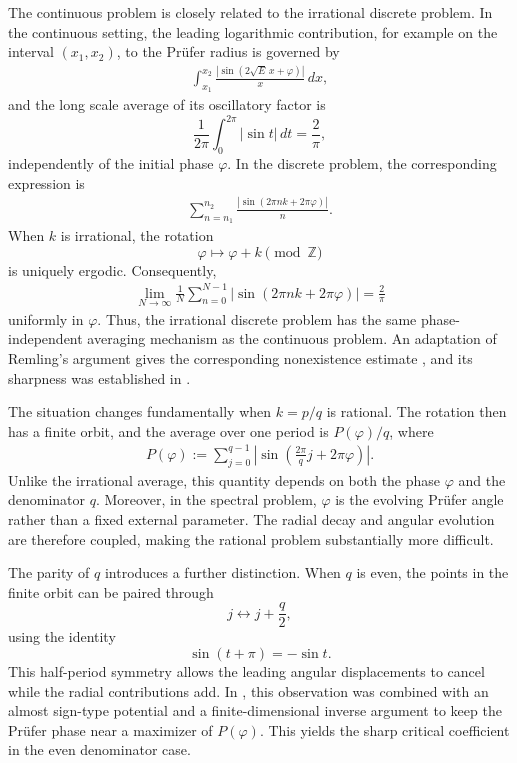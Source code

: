 \documentclass[12pt]{amsart}
\theoremstyle{plain}
\theoremstyle{definition}
\begin{document}
The continuous problem is closely related to the irrational discrete problem. In the continuous setting, the leading logarithmic contribution, for example on the interval $(x_1,x_2)$, to the Pr\"ufer radius is governed by
\begin{align}
	\int_{x_1}^{x_2}
	\frac{|\sin(2\sqrt E\,x+\varphi)|}{x}\,dx,
	\nonumber
\end{align}
and the long scale average of its oscillatory factor is
\[
\frac{1}{2\pi}\int_0^{2\pi}|\sin t|\,dt
=\frac{2}{\pi},
\]
independently of the initial phase $\varphi$. In the discrete problem, the corresponding expression is
\begin{align}
	\sum_{n=n_1}^{n_2}
	\frac{|\sin(2\pi nk+2\pi\varphi)|}{n}.
	\nonumber
\end{align}
When $k$ is irrational, the rotation
\[
\varphi\longmapsto\varphi+k\pmod{\mathbb Z}
\]
is uniquely ergodic. Consequently,
\begin{align}
	\lim_{N\to\infty}\frac1N
	\sum_{n=0}^{N-1}
	|\sin(2\pi nk+2\pi\varphi)|
	=\frac{2}{\pi}
	\nonumber
\end{align}
uniformly in $\varphi$. Thus, the irrational discrete problem has the same phase-independent averaging mechanism as the continuous problem. An adaptation of Remling's argument gives the corresponding nonexistence estimate \cite{RemlingCMP}, and its sharpness was established in \cite{LiuDiscrete}.

The situation changes fundamentally when $k=p/q$ is rational. The rotation then has a finite orbit, and the average over one period is
$P(\varphi)/q$, where
\begin{align}
	P(\varphi):=
	\sum_{j=0}^{q-1}
	\left|
	\sin\left(\frac{2\pi}{q}j+2\pi\varphi\right)
	\right|.
	\nonumber
\end{align}
Unlike the irrational average, this quantity depends on both the phase $\varphi$ and the denominator $q$. Moreover, in the spectral problem, $\varphi$ is the evolving Pr\"ufer angle rather than a fixed external parameter. The {radial} decay and angular evolution are therefore coupled, making the rational problem substantially more difficult.

The parity of $q$ introduces a further distinction. When $q$ is even, the points in the finite orbit can be paired through
\[
j\longleftrightarrow j+\frac q2,
\]
using the identity
\[
\sin(t+\pi)=-\sin t.
\]
This half-period symmetry allows the leading angular displacements to cancel while the {radial} contributions add. In \cite{LiuDiscrete}, this observation was combined with an almost sign-type potential and a finite-dimensional inverse argument to keep the Pr\"ufer phase near a maximizer of $P(\varphi)$. This yields the sharp critical coefficient in the even denominator case.
\end{document}
